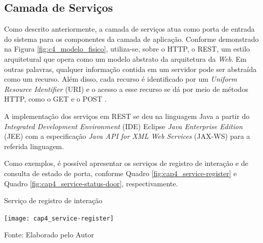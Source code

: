 
\subsection{Camada de Serviços} \label{ssec:c5_camada_servicos}

Como descrito anteriormente, a camada de serviços atua como porta de entrada do sistema para os componentes da camada de aplicação. 
Conforme demonstrado na Figura \ref{fig:c4_modelo_fisico}, utiliza-se, sobre o HTTP, o REST, um estilo arquitetural que opera como um modelo abstrato da arquitetura da \textit{Web}. Em outras palavras, qualquer informação contida em um servidor pode ser abstraída como um recurso. Além disso, cada recurso é identificado por um \textit{Uniform Resource Identifier } (URI) e o acesso a esse recurso se dá por meio de métodos HTTP, como o GET e o POST \cite{Fielding2000}.

A implementação dos serviços em REST se deu na linguagem Java a partir do \textit{ Integrated Development Environment} (IDE) Eclipse \textit{Java Enterprise Edition} (JEE) com a especificação \textit{Java API for XML Web Services} (JAX-WS) para a referida linguagem.

Como exemplos, é possível apresentar os serviços de registro de interação e de consulta de estado de porta, conforme Quadro \ref{fig:cap4_service-register} e Quadro \ref{fig:cap4_service-status-door}, respectivamente.

\begin{quadro}[htb]
    \caption{Serviço de registro de interação}
    \label{fig:cap4_service-register}
    \texttt{[image: cap4\_service-register]}
    
    \footnotesize{Fonte: Elaborado pelo Autor}
\end{quadro}


%        


